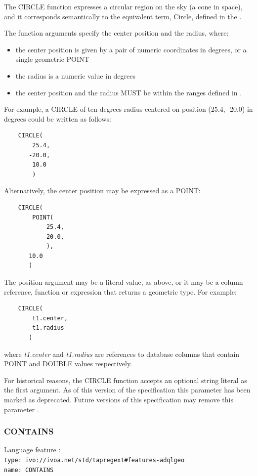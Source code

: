 \documentclass[11pt,a4paper]{ivoa}
\begin{document}
The CIRCLE function expresses a circular region on the sky (a cone in space),
and it corresponds semantically to the equivalent term, Circle, defined in
the \STCSpec{}.

The function arguments specify the center position and the radius, where:
\begin{itemize}
    \item the center position is given by a pair of numeric coordinates
    in degrees, or a single geometric POINT
    \item the radius is a numeric value in degrees
    \item the center position and the radius MUST be within the ranges defined in
    .
\end{itemize}

For example, a CIRCLE of ten degrees radius centered on position
(25.4, -20.0) in degrees could be written as follows:
\begin{verbatim}
    CIRCLE(
        25.4,
       -20.0,
        10.0
        )
\end{verbatim}

Alternatively, the center position may be expressed as a POINT:
\begin{verbatim}
    CIRCLE(
        POINT(
            25.4,
           -20.0,
            ),
       10.0
       )
\end{verbatim}

The position argument may be a literal value, as above, or it may be a
column reference, function or expression that returns a geometric type.
For example:
\begin{verbatim}
    CIRCLE(
        t1.center,
        t1.radius
       )
\end{verbatim}
where \textit{t1.center} and \textit{t1.radius} are references to
database columns that contain POINT and DOUBLE values respectively.

For historical reasons, the CIRCLE function accepts an optional string literal
as the first argument.
As of this version of the specification this parameter has been
marked as deprecated.
Future versions of this specification may remove this parameter
.

\subsubsection{CONTAINS}
\label{sec:functions.geom.contains}
{\footnotesize Language feature :}\\
{\footnotesize \verb|type: ivo://ivoa.net/std/tapregext#features-adqlgeo|}\\
{\footnotesize \verb|name: CONTAINS|}\\
\end{document}
